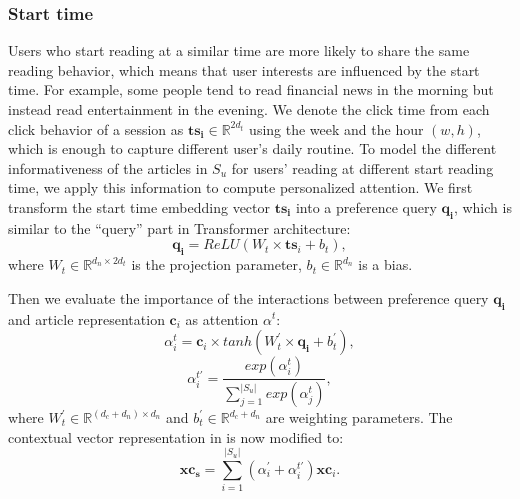 \subsubsection{Start time}
Users who start reading at a similar time are more likely to share the 
same reading behavior, which means that user interests are influenced by 
the start time. For example, some people tend to read financial news in 
the morning but instead read entertainment in the evening. 
We denote the click time from each click behavior of a session 
as $\mathbf{ts_i}\in \mathbb{R}^{2d_t}$ using the week and the hour $(w, h)$, which is enough to capture different user's daily routine. To model the different informativeness of the articles in $S_u$ for users' reading at different start reading time, we apply this information to compute personalized attention. We first transform the start time embedding vector $\mathbf{ts_i}$ into a preference query $\mathbf{q_i}$, which is similar to the ``query'' part in Transformer architecture:
\begin{equation}
    \mathbf{q_i} = ReLU(W_t \times \mathbf{ts}_i + b_t),
\end{equation}
where $W_t \in \mathbb{R}^{d_n \times 2d_t}$ is the projection parameter, $b_t \in \mathbb{R}^{d_n}$ is a bias.

Then we evaluate the importance of the interactions between preference query $\mathbf{q_i}$ and article representation $\mathbf{c}_i$ as attention $\alpha^{t}$:
\begin{equation}
    \alpha_i^{t} = \mathbf{c}_i \times tanh ( W_t^{\prime} \times \mathbf{q_i} + b_t^{\prime}),
\end{equation}
\begin{equation}
    \alpha_i^{t\prime} = \frac{exp(\alpha_i^{t})}{\sum_{j=1}^{|S_u|}exp(\alpha_j^{t})},
\end{equation}
where $W_t^{\prime} \in \mathbb{R}^{(d_c+d_n)\times d_n}$ and $b_t^{\prime} \in \mathbb{R}^{d_c+d_n}$ are weighting parameters. The contextual vector representation in  is now modified to:
\begin{equation}
    \mathbf{xc_s} = \sum_{i=1}^{|S_u|} (\alpha_i^{\prime}+\alpha_i^{t\prime}) \mathbf{xc}_i.
\end{equation}

